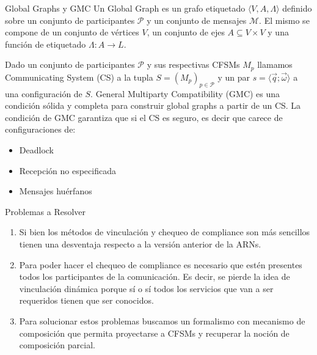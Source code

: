 \documentclass[10pt,xcolor={table,dvipsnames},t]{beamer}
\begin{document}
\begin{frame}{Global Graphs y GMC}
Un Global Graph es un grafo etiquetado $\langle V, A, \Lambda \rangle$ definido sobre un conjunto de participantes $\mathcal{P}$ y un conjunto de mensajes $\mathcal{M}$. El mismo se compone de un conjunto de vértices $V$, un conjunto de ejes $A \subseteq V \times V$ y una función de etiquetado $\Lambda: A \rightarrow L$. 

Dado un conjunto de participantes $\mathcal{P}$ y sus respectivas CFSMs $M_p$ llamamos Communicating System (CS) a la tupla $S=(M_p)_{p \in \mathcal{P}}$ y un par $s=\langle \overrightarrow{q} ; \overrightarrow{\omega} \rangle$ a una configuración de $S$. General Multiparty Compatibility (GMC) es una condición sólida y completa para construir global graphs a partir de un CS. La condición de GMC garantiza que si el CS es seguro, es decir que carece de configuraciones de: 
\begin{itemize}
    \item Deadlock
    \item Recepción no especificada
    \item Mensajes huérfanos
\end{itemize}
    
\end{frame}

\begin{frame}{Problemas a Resolver}
\begin{enumerate}
    \item Si bien los métodos de vinculación y chequeo de compliance son más sencillos tienen una desventaja respecto a la versión anterior de la ARNs. \\
    \item Para poder hacer el chequeo de compliance es necesario que estén presentes todos los participantes de la comunicación. Es decir, se pierde la idea de vinculación dinámica porque sí o sí todos los servicios que van a ser requeridos tienen que ser conocidos.\\
    \item Para solucionar estos problemas buscamos un formalismo con mecanismo de composición que permita proyectarse a CFSMs y recuperar la noción de composición parcial.

\end{enumerate}
\end{frame}
\end{document}
